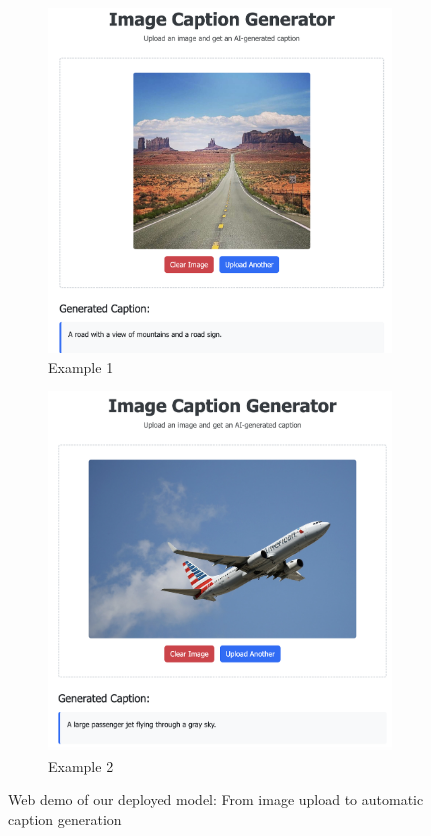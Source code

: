 \documentclass[11pt]{article}
\begin{document}
\begin{figure}[h]
    \centering
    \begin{subfigure}[b]{0.45\textwidth}
        \centering
        \includegraphics[width=\textwidth]{F4.png}
        \caption{Example 1}
        \label{fig:upload}
    \end{subfigure}
    \hfill
    \begin{subfigure}[b]{0.43\textwidth}
        \centering
        \includegraphics[width=\textwidth]{F5.png}
        \caption{Example 2}
        \label{fig:caption}
    \end{subfigure}
    \caption{Web demo of our deployed model: From image upload to automatic caption generation}
    \label{fig:web_demo}
\end{figure}
\end{document}
